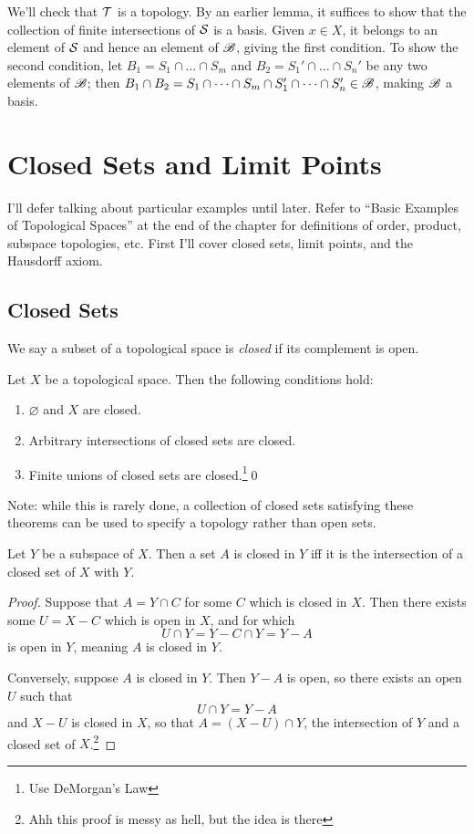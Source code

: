 \documentclass[10pt]{report}
\begin{document}
  We'll check that $\mathcal{T}$ is a topology.
  By an earlier lemma, it suffices to show that the collection of finite intersections of $\mathcal{S}$ is a basis.
  Given $x \in X$, it belongs to an element of $\mathcal{S}$ and hence an element of $\mathscr{B}$, giving the first condition.
  To show the second condition, let $B_1 = S_1 \cap \dots \cap S_m$ and $B_2 = S_1' \cap \dots \cap S_n'$ be any two elements of $\mathscr{B}$; then $B_1 \cap B_2 = S_1 \cap \dots \cap S_m \cap S_1' \cap \dots \cap S_n' \in \mathscr{B}$, making $\mathscr{B}$ a basis.
 

\newpage
\section{Closed Sets and Limit Points}
I'll defer talking about particular examples until later.
Refer to ``Basic Examples of Topological Spaces'' at the end of the chapter for definitions of order, product, subspace topologies, etc.
First I'll cover closed sets, limit points, and the Hausdorff axiom.

\subsection{Closed Sets}
We say a subset of a topological space is \emph{closed} if its complement is open.
\begin{theorem}
  Let $X$ be a topological space.
  Then the following conditions hold:
  \begin{enumerate}[label={(\arabic*)}]
    \item $\varnothing$ and $X$ are closed.
    \item Arbitrary intersections of closed sets are closed.
    \item Finite unions of closed sets are closed.\footnote{Use DeMorgan's Law}\qed
  \end{enumerate}
\end{theorem}

Note: while this is rarely done, a collection of closed sets satisfying these theorems can be used to specify a topology rather than open sets.

\begin{theorem}
  Let $Y$ be a subspace of $X$.
  Then a set $A$ is closed in $Y$ iff it is the intersection of a closed set of $X$ with $Y$.
\end{theorem}
\begin{proof}
  Suppose that $A = Y \cap C$ for some $C$ which is closed in $X$.
  Then there exists some $U = X - C$ which is open in $X$, and for which
  \[
    U \cap Y = Y - C \cap Y = Y - A
  \]
  is open in $Y$, meaning $A$ is closed in $Y$.
  
  Conversely, suppose $A$ is closed in $Y$.
  Then $Y - A$ is open, so there exists an open $U$ such that
  \[
    U \cap Y = Y - A
  \]
  and $X - U$ is closed in $X$, so that $A = (X - U) \cap Y$, the intersection of $Y$ and a closed set of $X$.\footnote{Ahh this proof is messy as hell, but the idea is there}
\end{proof}
\end{document}
